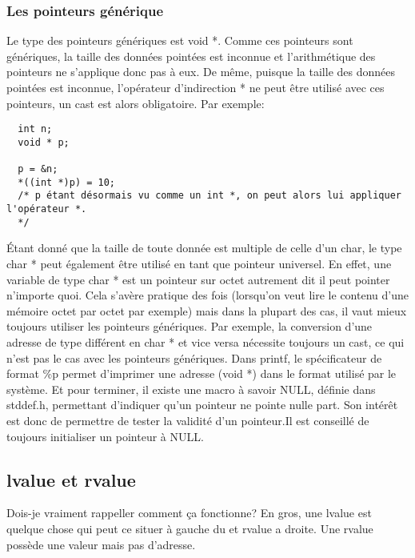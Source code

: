 \documentclass[a4paper]{article}
\begin{document}
\subsubsection{Les pointeurs générique}
 Le type des pointeurs génériques est void *. Comme ces pointeurs sont génériques, la taille des données pointées est inconnue et l'arithmétique des pointeurs ne s'applique donc pas à eux. De même, puisque la taille des données pointées est inconnue, l'opérateur d'indirection * ne peut être utilisé avec ces pointeurs, un cast est alors obligatoire. Par exemple:
\begin{lstlisting}
  int n;
  void * p;

  p = &n;
  *((int *)p) = 10;
  /* p étant désormais vu comme un int *, on peut alors lui appliquer l'opérateur *.
  */
\end{lstlisting}
Étant donné que la taille de toute donnée est multiple de celle d'un char, le type char * peut également être utilisé en tant que pointeur universel. En effet, une variable de type char * est un pointeur sur octet autrement dit il peut pointer n'importe quoi. Cela s'avère pratique des fois (lorsqu'on veut lire le contenu d'une mémoire octet par octet par exemple) mais dans la plupart des cas, il vaut mieux toujours utiliser les pointeurs génériques. Par exemple, la conversion d'une adresse de type différent en char * et vice versa nécessite toujours un cast, ce qui n'est pas le cas avec les pointeurs génériques.\newline
Dans printf, le spécificateur de format \%p permet d'imprimer une adresse (void *) dans le format utilisé par le système.\newline
Et pour terminer, il existe une macro à savoir NULL, définie dans stddef.h, permettant d'indiquer qu'un pointeur ne pointe nulle part. Son intérêt est donc de permettre de tester la validité d'un pointeur.Il est conseillé de toujours initialiser un pointeur à NULL.

\subsection{lvalue et rvalue}
Dois-je vraiment rappeller comment ça fonctionne?
En gros, une lvalue est quelque chose qui peut ce situer à gauche du \guillemotleft{=}\guillemotright{} et rvalue a droite. Une rvalue possède une valeur mais pas d'adresse.
\end{document}
